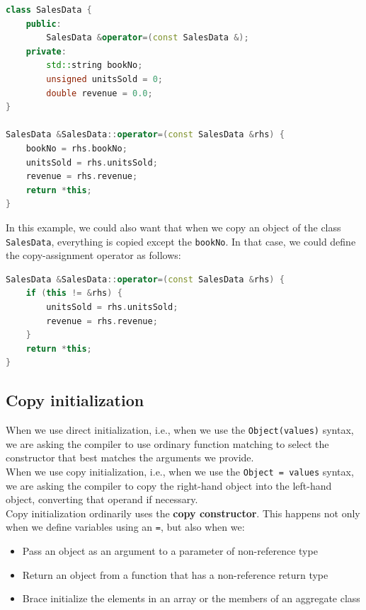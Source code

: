 \begin{lstlisting}[language=C++]
class SalesData {
    public:
        SalesData &operator=(const SalesData &);
    private:
        std::string bookNo;
        unsigned unitsSold = 0;
        double revenue = 0.0;
}

SalesData &SalesData::operator=(const SalesData &rhs) {
    bookNo = rhs.bookNo;
    unitsSold = rhs.unitsSold;
    revenue = rhs.revenue;
    return *this;
}
\end{lstlisting}

In this example, we could also want that when we copy an object of the class \texttt{SalesData},
everything is copied except the \texttt{bookNo}. In that case, we could define the copy-assignment
operator as follows:\\

\begin{lstlisting}[language=C++]
SalesData &SalesData::operator=(const SalesData &rhs) {
    if (this != &rhs) {
        unitsSold = rhs.unitsSold;
        revenue = rhs.revenue;
    }
    return *this;
}
\end{lstlisting}

\subsection{Copy initialization}

When we use direct initialization, i.e., when we use the \texttt{Object(values)} syntax, 
we are asking the compiler to use ordinary function matching to select the constructor 
that best matches the arguments we provide.\\

When we use copy initialization, i.e., when we use the \texttt{Object = values} syntax,
we are asking the compiler to copy the right-hand object into the left-hand object, 
converting that operand if necessary.\\

Copy initialization ordinarily uses the \textbf{copy constructor}. This happens not only 
when we define variables using an \texttt{=}, but also when we:

\begin{itemize}
    \item Pass an object as an argument to a parameter of non-reference type
    \item Return an object from a function that has a non-reference return type
    \item Brace initialize the elements in an array or the members of an aggregate
    class
\end{itemize}

